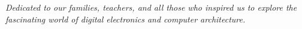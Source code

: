 \chapter*{}
\vspace*{\fill}

\begin{center}
\begin{minipage}{0.75\textwidth}
\itshape
    Dedicated to our families, teachers, and all those who inspired us to explore the fascinating world of digital electronics and computer architecture.
\end{minipage}
\end{center}

\vspace*{\fill}
\newpage
